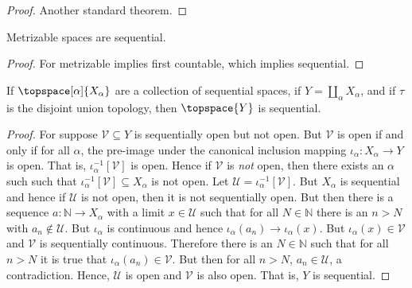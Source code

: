             \begin{proof}
                Another standard theorem.
            \end{proof}
            \begin{theorem}
                Metrizable spaces are sequential.
            \end{theorem}
            \begin{proof}
                For metrizable implies first countable, which implies
                sequential.
            \end{proof}
            \begin{theorem}
                If $\topspace[\alpha]{X_{\alpha}}$ are a collection of
                sequential spaces, if $Y=\coprod_{\alpha}X_{\alpha}$,
                and if $\tau$ is the disjoint union topology, then
                $\topspace{Y}$ is sequential.
            \end{theorem}
            \begin{proof}
                For suppose $\mathcal{V}\subseteq{Y}$ is sequentially
                open but not open. But $\mathcal{V}$ is open if and only
                if for all $\alpha$, the pre-image under the canonical
                inclusion mapping
                $\iota_{\alpha}:X_{\alpha}\rightarrow{Y}$ is open. That
                is, $\iota_{\alpha}^{\minus{1}}[\mathcal{V}]$ is open.
                Hence if $\mathcal{V}$ is \textit{not} open, then there
                exists an $\alpha$ such such that
                $\iota_{\alpha}^{\minus{1}}[\mathcal{V}]\subseteq{X}_{\alpha}$
                is not open. Let $\mathcal{U}=\iota_{\alpha}^{\minus{1}}[\mathcal{V}]$.
                But $X_{\alpha}$ is sequential and hence if $\mathcal{U}$
                is not open, then it is not sequentially open. But then
                there is a sequence $a:\mathbb{N}\rightarrow{X}_{\alpha}$
                with a limit $x\in\mathcal{U}$ such that for all
                $N\in\mathbb{N}$ there is an $n>N$ with
                $a_{n}\notin\mathcal{U}$. But $\iota_{\alpha}$ is
                continuous and hence
                $\iota_{\alpha}(a_{n})\rightarrow\iota_{\alpha}(x)$. But
                $\iota_{\alpha}(x)\in\mathcal{V}$ and $\mathcal{V}$ is
                sequentially continuous. Therefore there is an
                $N\in\mathbb{N}$ such that for all $n>N$ it is true that
                $\iota_{\alpha}(a_{n})\in\mathcal{V}$. But then for all
                $n>N$, $a_{n}\in\mathcal{U}$, a contradiction. Hence,
                $\mathcal{U}$ is open and $\mathcal{V}$ is also open.
                That is, $Y$ is sequential.
            \end{proof}
